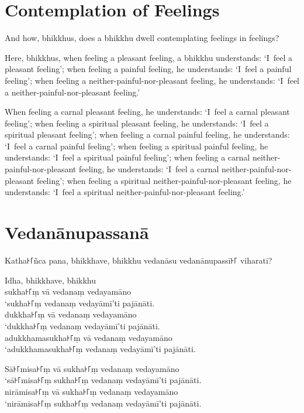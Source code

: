 

\englishPage
\chapter{Contemplation of Feelings}

And how, bhikkhus, does a bhikkhu dwell contemplating feelings in feelings?

Here, bhikkhus, when feeling a pleasant feeling, a bhikkhu understands:
`I~feel a pleasant feeling';
when feeling a painful feeling, he understands:
`I~feel a painful feeling';
when feeling a neither-painful-nor-pleasant feeling, he understands:
`I~feel a neither-painful-nor-pleasant feeling.'

When feeling a carnal pleasant feeling, he understands:
`I~feel a carnal pleasant feeling';
when feeling a spiritual pleasant feeling, he understands:
`I~feel a spiritual pleasant feeling';
when feeling a carnal painful feeling, he understands:
`I~feel a carnal painful feeling';
when feeling a spiritual painful feeling, he understands:
`I~feel a spiritual painful feeling';
when feeling a carnal neither-painful-nor-pleasant feeling, he understands:
`I~feel a carnal neither-painful-nor-pleasant feeling';
when feeling a spiritual neither-painful-nor-pleasant feeling, he understands:
`I~feel a spiritual neither-painful-nor-pleasant feeling.'

\paliPage
\chapter*{Vedanānupassanā}

Katha꜔꜒ñca pana, bhikkhave, bhikkhu vedanāsu vedanānupassī꜔꜒ viharati?

Idha, bhikkhave, bhikkhu\\
sukha꜔꜒ṃ vā vedanaṃ vedayamāno\\
‘sukha꜔꜒ṃ vedanaṃ vedayāmī’ti pajānāti.\\
dukkha꜔꜒ṃ vā vedanaṃ vedayamāno\\
‘dukkha꜔꜒ṃ vedanaṃ vedayāmī’ti pajānāti.\\
adukkhamasukha꜔꜒ṃ vā vedanaṃ vedayamāno\\
‘adukkhamasukha꜔꜒ṃ vedanaṃ vedayāmī’ti pajānāti.

Sā꜔꜒misa꜔꜒ṃ vā sukha꜔꜒ṃ vedanaṃ vedayamāno\\
‘sā꜔꜒misa꜔꜒ṃ sukha꜔꜒ṃ vedanaṃ vedayāmī’ti pajānāti.\\
nirāmisa꜔꜒ṃ vā sukha꜔꜒ṃ vedanaṃ vedayamāno\\
‘nirāmisa꜔꜒ṃ sukha꜔꜒ṃ vedanaṃ vedayāmī’ti pajānāti.

